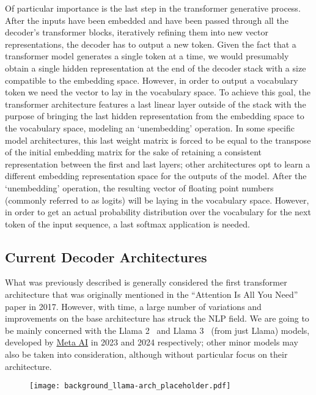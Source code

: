 Of particular importance is the last step in the transformer generative process.
After the inputs have been embedded and have been passed through all the decoder's transformer blocks, iteratively refining them into new vector representations, the decoder has to output a new token.
Given the fact that a transformer model generates a single token at a time, we would presumably obtain a single hidden representation at the end of the decoder stack with a size compatible to the embedding space.
However, in order to output a vocabulary token we need the vector to lay in the vocabulary space.
To achieve this goal, the transformer architecture features a last linear layer outside of the stack with the purpose of bringing the last hidden representation from the embedding space to the vocabulary space, modeling an `unembedding' operation.
In some specific model architectures, this last weight matrix is forced to be equal to the transpose of the initial embedding matrix for the sake of retaining a consistent representation between the first and last layers; other architectures opt to learn a different embedding representation space for the outputs of the model.
After the `unembedding' operation, the resulting vector of floating point numbers (commonly referred to as logits) will be laying in the vocabulary space.
However, in order to get an actual probability distribution over the vocabulary for the next token of the input sequence, a last softmax application is needed.

\subsection{Current Decoder Architectures}

What was previously described is generally considered the first transformer architecture that was originally mentioned in the ``Attention Is All You Need''~\cite{vaswani2017} paper in 2017.
However, with time, a large number of variations and improvements on the base architecture has struck the NLP field.
We are going to be mainly concerned with the Llama 2~\cite{touvron2023} and Llama 3~\cite{dubey2024} (from  just Llama) models, developed by \href{https://ai.meta.com/}{Meta AI} in 2023 and 2024 respectively; other minor models may also be taken into consideration, although without particular focus on their architecture.

\begin{figure}[t!]
    \centering
    \texttt{[image: background\_llama-arch\_placeholder.pdf]}
    \caption{}
    \label{fig:background_llama-arch}
\end{figure}

